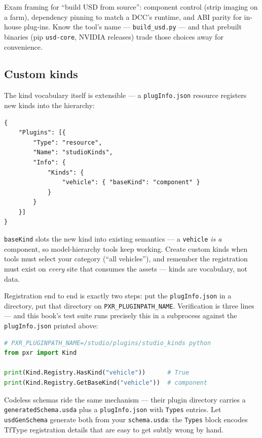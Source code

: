 \begin{ExamTip}
Exam framing for ``build USD from source'': component control (strip
imaging on a farm), dependency pinning to match a DCC's runtime, and ABI
parity for in-house plug-ins. Know the tool's name ---
\texttt{build\_usd.py} --- and that prebuilt binaries (pip
\texttt{usd-core}, NVIDIA releases) trade those choices away for
convenience.
\end{ExamTip}

\subsection{Custom kinds}\label{sec:cu-kinds}
The kind vocabulary itself is extensible --- a
\texttt{plugInfo.json} resource registers new kinds into the hierarchy:

\begin{lstlisting}
{
    "Plugins": [{
        "Type": "resource",
        "Name": "studioKinds",
        "Info": {
            "Kinds": {
                "vehicle": { "baseKind": "component" }
            }
        }
    }]
}
\end{lstlisting}

\noindent\texttt{baseKind} slots the new kind into existing semantics ---
a \texttt{vehicle} \emph{is a} component, so model-hierarchy tools keep
working. Create custom kinds when tools must select your category
(``all vehicles''), and remember the registration must exist on
\emph{every} site that consumes the assets --- kinds are vocabulary, not
data.

Registration end to end is exactly two steps: put the
\texttt{plugInfo.json} in a directory, put that directory on
\texttt{PXR\_PLUGINPATH\_NAME}. Verification is three lines --- and this
book's test suite runs precisely this in a subprocess against the
\texttt{plugInfo.json} printed above:

\begin{lstlisting}[language=Python]
# PXR_PLUGINPATH_NAME=/studio/plugins/studio_kinds python
from pxr import Kind

print(Kind.Registry.HasKind("vehicle"))      # True
print(Kind.Registry.GetBaseKind("vehicle"))  # component
\end{lstlisting}

\noindent Codeless schemas ride the same mechanism --- their plugin
directory carries a \texttt{generatedSchema.usda} plus a
\texttt{plugInfo.json} with \texttt{Types} entries. Let
\texttt{usdGenSchema} generate both from your \texttt{schema.usda}:
the \texttt{Types} block encodes TfType registration details that are
easy to get subtly wrong by hand.

